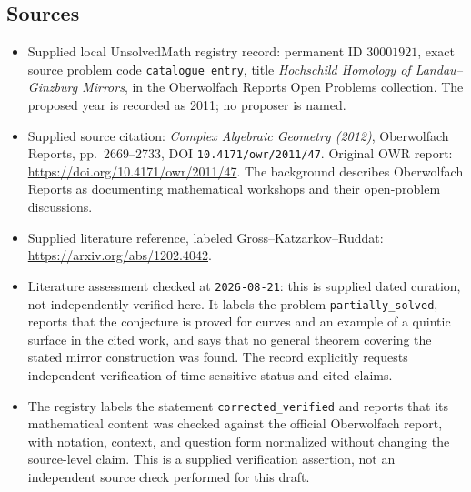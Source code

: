 \documentclass[11pt]{article}
\begin{document}
\subsection{Sources}
\begin{itemize}
\item Supplied local UnsolvedMath registry record: permanent ID \(30001921\), exact source problem code \texttt{catalogue entry}, title \emph{Hochschild Homology of Landau--Ginzburg Mirrors}, in the Oberwolfach Reports Open Problems collection. The proposed year is recorded as 2011; no proposer is named.
\item Supplied source citation: \emph{Complex Algebraic Geometry (2012)}, Oberwolfach Reports, pp.~2669--2733, DOI \texttt{10.4171/owr/2011/47}. Original OWR report: \url{https://doi.org/10.4171/owr/2011/47}. The background describes Oberwolfach Reports as documenting mathematical workshops and their open-problem discussions.
\item Supplied literature reference, labeled Gross--Katzarkov--Ruddat: \url{https://arxiv.org/abs/1202.4042}.
\item Literature assessment checked at \texttt{2026-08-21}: this is supplied dated curation, not independently verified here. It labels the problem \texttt{partially\_solved}, reports that the conjecture is proved for curves and an example of a quintic surface in the cited work, and says that no general theorem covering the stated mirror construction was found. The record explicitly requests independent verification of time-sensitive status and cited claims.
\item The registry labels the statement \texttt{corrected\_verified} and reports that its mathematical content was checked against the official Oberwolfach report, with notation, context, and question form normalized without changing the source-level claim. This is a supplied verification assertion, not an independent source check performed for this draft.
\end{itemize}
\end{document}
